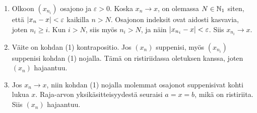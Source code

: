 \documentclass[11pt,a4paper]{amsart}
\begin{document}
\begin{solution}
  \leavevmode\par
  \begin{enumerate}[label=(\arabic*), nosep]
    \item Olkoon \((x_{n_i})\) osajono ja \(\varepsilon>0\). Koska
      \(x_n\to x\), on olemassa \(N\in\mathbb{N}_1\) siten, että
      \(\lvert x_n-x\rvert<\varepsilon\) kaikilla \(n > N\).
      Osajonon indeksit ovat aidosti kasvavia, joten \(n_i\geq i\).
      Kun \(i > N\), siis myös \(n_i > N\), ja näin
      \(\lvert x_{n_i}-x\rvert<\varepsilon\). Siis \(x_{n_i}\to x\).
    \item Väite on kohdan (1) kontrapositio. Jos \((x_n)\) suppenisi,
      myös \((x_{n_i})\) suppenisi kohdan
      (1) nojalla. Tämä on ristiriidassa oletuksen kanssa, joten
      \((x_n)\) hajaantuu.
    \item Jos \(x_n\to x\), niin kohdan (1) nojalla molemmat osajonot
      suppenisivat kohti lukua \(x\). Raja-arvon yksikäsitteisyydestä
      seuraisi \(a=x=b\), mikä on ristiriita. Siis \((x_n)\) hajaantuu.
  \end{enumerate}
\end{solution}
\end{document}
